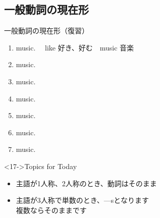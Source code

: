 \documentclass[aspectratio=169,xcolor={dvipsnames,table}]{beamer}
\begin{document}
\subsection{一般動詞の現在形}
\begin{frame}[plain]{一般動詞の現在形（復習）}
\begin{enumerate}
   \item<1->   music. \hfill{\scriptsize 　like  好き、好む　music  音楽}
   \item<3->   music.
   \item<4->   music.
   \item<5->   music.
   \item<6->   music.
   \item<7->   music.
   \item<8->   music.
  \end{enumerate}
\begin{block}<17->{Topics for Today}
\begin{itemize}[square]\small
 \item<1-> {主語が1人称、2人称のとき、動詞はそのまま}
 \item<2-> {主語が3人称で単数のとき、---sとなります}\\
      \hspace{7\zw}複数ならそのままです
\end{itemize}
      \end{block}
\end{frame}
\end{document}

